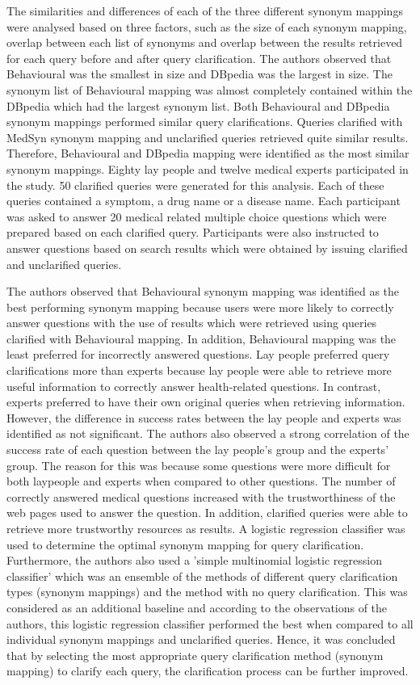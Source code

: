 \documentclass[]{article}
\begin{document}
The similarities and differences of each of the three different synonym mappings were analysed based on three factors, such as the size of each synonym mapping, overlap between each list of synonyms and overlap between the results retrieved for each query before and after query clarification. The authors observed that Behavioural was the smallest in size and DBpedia was the largest in size. The synonym list of Behavioural mapping was almost completely contained within the DBpedia which had the largest synonym list.  Both Behavioural and DBpedia synonym mappings performed similar query clarifications. Queries clarified with MedSyn synonym mapping and unclarified queries retrieved quite similar results. Therefore, Behavioural and DBpedia mapping were identified as the most similar synonym mappings. Eighty lay people and  twelve medical experts participated in the study. 50 clarified queries were generated for this analysis. Each of these queries contained a symptom, a drug name or a disease name. Each participant was asked to answer 20 medical related multiple choice questions which were prepared based on each clarified query. Participants were also instructed to answer questions based on search results which were obtained by issuing clarified  and unclarified queries.

The authors observed that Behavioural synonym mapping was identified as the best performing synonym mapping because users were more likely to correctly answer questions with the use of results which were retrieved using queries clarified with Behavioural mapping. In addition, Behavioural mapping was the least preferred for incorrectly answered questions. Lay people preferred query clarifications more than experts because lay people were able to retrieve  more useful information to correctly answer health-related questions. In contrast, experts preferred to have their own original queries when retrieving information. However, the difference in success rates between the lay people and experts was identified as not significant. The authors also observed a strong correlation of the success rate of each question between the lay people's group and the experts' group. The reason for this was because some questions were more difficult for both laypeople and experts when compared to other questions. The number of correctly answered medical questions increased with the trustworthiness of the web pages used to answer the question. In addition, clarified queries were able to retrieve more trustworthy resources as results. A logistic regression classifier was used to determine the optimal synonym mapping for query clarification. Furthermore, the authors also used a 'simple multinomial logistic regression classifier' which was an ensemble of the methods of different query clarification types (synonym mappings) and the method with no query clarification. This was considered as an additional baseline and according to the observations of the authors, this logistic regression classifier performed the best when compared to all individual synonym mappings and unclarified queries. Hence, it was concluded that by selecting the most appropriate query clarification method (synonym mapping) to clarify each query, the clarification process can be further improved. 
\end{document}

